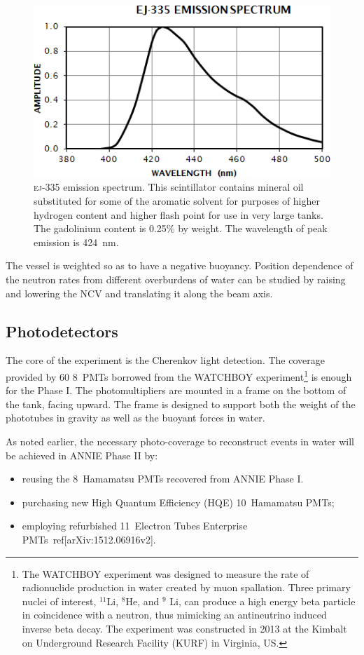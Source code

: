 \begin{figure}[]
   \centering
   \includegraphics[scale=0.60]{pics/ej335}
   \caption{\textsc{ej-335} emission spectrum. This scintillator contains mineral oil %
 substituted for some of the aromatic solvent for purposes of higher hydrogen content %
 and higher flash point for use in very large tanks. The gadolinium content is 0.25\% by weight.
 The wavelength of peak emission is 424~nm.}
   \label{fig:ej335}
 \end{figure}

 The vessel is weighted so as to have a negative buoyancy.
 Position dependence of the neutron rates from different overburdens of water can be %
 studied by raising and lowering the NCV and translating it along the beam axis.

\subsection{Photodetectors}
\label{2.2.1}
 The core of the experiment is the Cherenkov light detection.
 The coverage provided by 60 8\inch~PMTs borrowed from the WATCHBOY experiment\footnote{The %
   WATCHBOY experiment was designed to measure the rate of radionuclide production in water %
   created by muon spallation. Three primary nuclei of interest, $^{11}$Li, $^8$He, and %
   $^9$ Li, can produce a high energy beta particle in coincidence with a neutron, thus mimicking %
   an antineutrino induced inverse beta decay. The experiment was constructed in 2013 at the %
   Kimbalt on Underground Research Facility (KURF) in Virginia, US.} is enough %
   for the Phase I.
 The photomultipliers are mounted in a frame on the bottom of the tank, facing upward.
 The frame is designed to support both the weight of the phototubes in gravity as well as the %
 buoyant forces in water. 

 As noted earlier, the necessary photo-coverage to reconstruct events in water %
 will be achieved in ANNIE Phase II by:
 \begin{itemize}
   \item reusing the 8\inch~Hamamatsu PMTs recovered from ANNIE Phase I.
   \item purchasing new High Quantum Efficiency (HQE) 10\inch~Hamamatsu PMTs;
   \item employing refurbished 11\inch~Electron Tubes Enterprise PMTs~ref[arXiv:1512.06916v2].
 \end{itemize}
 
